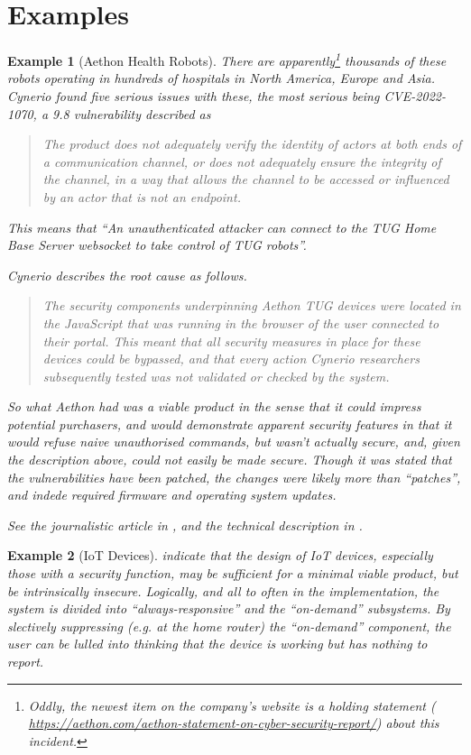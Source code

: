 \documentclass{article}
\newtheorem{example}{Example}
\begin{document}
\section{Examples}
\begin{example}[Aethon Health Robots]
\rm 
There are apparently\footnote{Oddly, the newest item on the company's website is a holding statement ( \url{https://aethon.com/aethon-statement-on-cyber-security-report/}) about this incident.} thousands of these robots operating in hundreds of hospitals in North America, Europe and Asia. Cynerio found five serious issues with these, the most serious being CVE-2022-1070, a 9.8 vulnerability described as
\begin{quote}
The product does not adequately verify
the identity of actors at both ends of a
communication channel, or does not adequately
ensure the integrity of the channel, in a way
that allows the channel to be accessed or
influenced by an actor that is not an endpoint.
\end{quote}
This means that ``An unauthenticated attacker can
connect to the TUG Home Base
Server websocket to take control
of TUG robots''.
\par
Cynerio  describes the root cause as follows.
\begin{quote}
The security components underpinning Aethon TUG devices were
located in the JavaScript that was running in the browser of the user connected to their portal. This meant
that all security measures in place for these devices could be bypassed, and that every action Cynerio
researchers subsequently tested was not validated or checked by the system.
\end{quote}
So what Aethon had was a viable product in the sense that it could impress potential purchasers, and would demonstrate apparent security features in that it would refuse naive unauthorised commands, but wasn't actually secure, and, given the description above, could not easily be made secure.  Though it was stated that the vulnerabilities have been patched, the changes were likely more than ``patches'', and indede required firmware and operating system updates. 
\par
See the journalistic article in \cite{Davis2022i}, and the technical description in \cite{Cynerio2022a}.
\end{example}
\begin{example}[IoT Devices]
\rm
\cite{OConnoretal2019a} indicate that the design of IoT devices, especially those with a security function, may be sufficient for a minimal viable product, but be intrinsically insecure. Logically, and all to often in the implementation, the system is divided into ``always-responsive'' and the ``on-demand'' subsystems. By slectively suppressing (e.g. at the home router) the ``on-demand'' component, the user can be lulled into thinking that the device is working but has nothing to report.
\end{example}
\end{document}
